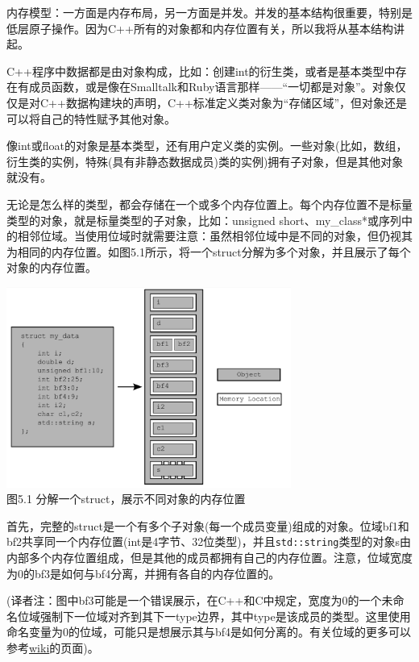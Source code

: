
内存模型：一方面是内存布局，另一方面是并发。并发的基本结构很重要，特别是低层原子操作。因为C++所有的对象都和内存位置有关，所以我将从基本结构讲起。


C++程序中数据都是由对象构成，比如：创建int的衍生类，或者是基本类型中存在有成员函数，或是像在Smalltalk和Ruby语言那样——“一切都是对象”。对象仅仅是对C++数据构建块的声明，C++标准定义类对象为“存储区域”，但对象还是可以将自己的特性赋予其他对象。

像int或float的对象是基本类型，还有用户定义类的实例。一些对象(比如，数组，衍生类的实例，特殊(具有非静态数据成员)类的实例)拥有子对象，但是其他对象就没有。

无论是怎么样的类型，都会存储在一个或多个内存位置上。每个内存位置不是标量类型的对象，就是标量类型的子对象，比如：unsigned short、my\_class*或序列中的相邻位域。当使用位域时就需要注意：虽然相邻位域中是不同的对象，但仍视其为相同的内存位置。如图5.1所示，将一个struct分解为多个对象，并且展示了每个对象的内存位置。


\begin{center}
    \includegraphics[width=0.7\textwidth]{content/chapter05/images/5-1.png}\\
    图5.1 分解一个struct，展示不同对象的内存位置
\end{center}

首先，完整的struct是一个有多个子对象(每一个成员变量)组成的对象。位域bf1和bf2共享同一个内存位置(int是4字节、32位类型)，并且\texttt{std::string}类型的对象s由内部多个内存位置组成，但是其他的成员都拥有自己的内存位置。注意，位域宽度为0的bf3是如何与bf4分离，并拥有各自的内存位置的。

(译者注：图中bf3可能是一个错误展示，在C++和C中规定，宽度为0的一个未命名位域强制下一位域对齐到其下一type边界，其中type是该成员的类型。这里使用命名变量为0的位域，可能只是想展示其与bf4是如何分离的。有关位域的更多可以参考\href{https://en.wikipedia.org/wiki/Bit_field}{wiki}的页面)。

